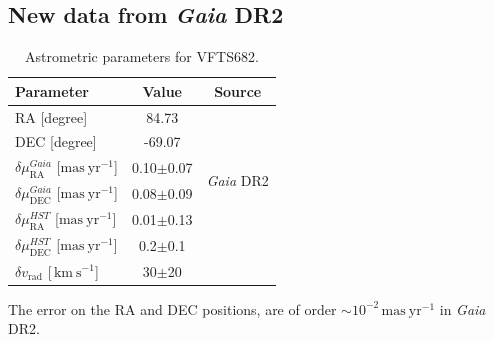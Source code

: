 \documentclass[a4paper,fleqn,usenatbib]{mnras}
\newcommand{\kms}{{\,\mathrm{km\ s^{-1}}}}
\DeclareRobustCommand{\Secref}[1]{Sec.~\ref{#1}}
\begin{document}
\subsection{New data from \emph{Gaia} DR2  \label{data:gaia}}

\begin{table}
  \begin{center}
    \caption{Astrometric parameters for VFTS682. }
    \begin{tabular}{l|c|c}
      \hline
      \hline
      Parameter & Value & Source\\
      \hline
      RA \hfill[degree] &  \phantom{-}84.73 %
                        & \multirow{2}{*}{\cite{evans:11}}\\[5pt]
      DEC \hfill [degree] & -69.07 %
                        & \\[5pt]
      \hline
      $\delta\mu_\mathrm{RA}^{Gaia}$  \hfill[$\mathrm{mas\ yr^{-1}}$] & 0.10$\pm$0.07 & \multirow{2}{*}{\emph{Gaia} DR2}\\[5pt]
      $\delta\mu_\mathrm{DEC}^{Gaia}$  \hfill[$\mathrm{mas\ yr^{-1}}$] & 0.08$\pm$0.09 & \\[5pt]
      \hline
      $\delta\mu_\mathrm{RA}^{HST}$  \hfill[$\mathrm{mas\ yr^{-1}}$] & 0.01$\pm$0.13 & \multirow{2}{*}{\cite{platais:18}}\\[5pt]
      $\delta\mu_\mathrm{DEC}^{HST}$  \hfill[$\mathrm{mas\ yr^{-1}}$] &
                                                                        0.2$\pm$0.1 &
      \\[5pt]
      \hline
      $\delta v_\mathrm{rad}$  \hfill[$\kms$] & 30$\pm$20 & \cite{bestenlehner:11}\\
      \hline
    \end{tabular}
    {The error on the RA and DEC positions, are of order
      $\sim$$10^{-2}\,\mathrm{mas\ yr^{-1}}$ in \emph{Gaia}
      DR2. %
    }
  \end{center}
  \label{tab:vfts682}
\end{table}
\end{document}
